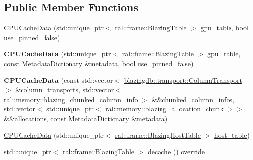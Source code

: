 \subsection*{Public Member Functions}
\begin{DoxyCompactItemize}
\item 
\hyperlink{classral_1_1cache_1_1CPUCacheData_a0b647a41636c90cd2992a2cc11994af1}{C\+P\+U\+Cache\+Data} (std\+::unique\+\_\+ptr$<$ \hyperlink{classral_1_1frame_1_1BlazingTable}{ral\+::frame\+::\+Blazing\+Table} $>$ gpu\+\_\+table, bool use\+\_\+pinned=false)
\item 
\mbox{\label{classral_1_1cache_1_1CPUCacheData_a3d3d74db3db35f1f60008e7e28c5a5c6}} 
{\bfseries C\+P\+U\+Cache\+Data} (std\+::unique\+\_\+ptr$<$ \hyperlink{classral_1_1frame_1_1BlazingTable}{ral\+::frame\+::\+Blazing\+Table} $>$ gpu\+\_\+table, const \hyperlink{classral_1_1cache_1_1MetadataDictionary}{Metadata\+Dictionary} \&\hyperlink{classral_1_1cache_1_1CacheData_aaeb232ef3aa8c2a3d86e1169ed2e8152}{metadata}, bool use\+\_\+pinned=false)
\item 
\mbox{\label{classral_1_1cache_1_1CPUCacheData_a55d89069b138a46d2ea591546a26c6b5}} 
{\bfseries C\+P\+U\+Cache\+Data} (const std\+::vector$<$ \hyperlink{structblazingdb_1_1transport_1_1ColumnTransport}{blazingdb\+::transport\+::\+Column\+Transport} $>$ \&column\+\_\+transports, std\+::vector$<$ \hyperlink{structral_1_1memory_1_1blazing__chunked__column__info}{ral\+::memory\+::blazing\+\_\+chunked\+\_\+column\+\_\+info} $>$ \&\&chunked\+\_\+column\+\_\+infos, std\+::vector$<$ std\+::unique\+\_\+ptr$<$ \hyperlink{structral_1_1memory_1_1blazing__allocation__chunk}{ral\+::memory\+::blazing\+\_\+allocation\+\_\+chunk} $>$$>$ \&\&allocations, const \hyperlink{classral_1_1cache_1_1MetadataDictionary}{Metadata\+Dictionary} \&\hyperlink{classral_1_1cache_1_1CacheData_aaeb232ef3aa8c2a3d86e1169ed2e8152}{metadata})
\item 
\hyperlink{classral_1_1cache_1_1CPUCacheData_ae74c9b51edabc2aa06f8923c6f3afc5f}{C\+P\+U\+Cache\+Data} (std\+::unique\+\_\+ptr$<$ \hyperlink{classral_1_1frame_1_1BlazingHostTable}{ral\+::frame\+::\+Blazing\+Host\+Table} $>$ \hyperlink{classral_1_1cache_1_1CPUCacheData_ae46ccefa906792a3b31bbd94e7fdcef1}{host\+\_\+table})
\item 
std\+::unique\+\_\+ptr$<$ \hyperlink{classral_1_1frame_1_1BlazingTable}{ral\+::frame\+::\+Blazing\+Table} $>$ \hyperlink{classral_1_1cache_1_1CPUCacheData_a03a18d3dfd4fe60dffdd0a9daabfbde2}{decache} () override
$$
\end{DoxyCompactItemize}
